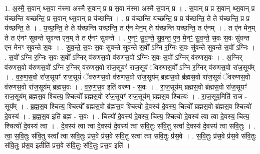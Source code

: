\documentclass[17pt]{extarticle}
\begin{document}
1. अ॒स्मै॒ स॒वान् थ्स॒वा न॑स्मा अस्मै स॒वान् प्र प्र स॒वा न॑स्मा अस्मै स॒वान् प्र । . स॒वान् प्र प्र स॒वान् थ्स॒वान् प्र य॑च्छन्ति यच्छन्ति॒ प्र स॒वान् थ्स॒वान् प्र य॑च्छन्ति । . प्र य॑च्छन्ति यच्छन्ति॒ प्र प्र य॑च्छन्ति॒ ते ते य॑च्छन्ति॒ प्र प्र य॑च्छन्ति॒ ते । . य॒च्छ॒न्ति॒ ते ते य॑च्छन्ति यच्छन्ति॒ त ए॑न मेन॒म् ते य॑च्छन्ति यच्छन्ति॒ त ए॑नम् । . त ए॑न मेन॒म् ते त ए॑नꣳ सुवन्ते सुवन्त एन॒म् ते त ए॑नꣳ सुवन्ते । . ए॒नꣳ॒॒ सु॒व॒न्ते॒ सु॒व॒न्त॒ ए॒न॒ मे॒नꣳ॒॒ सु॒व॒न्ते॒ स॒वः स॒वः सु॑वन्त एन मेनꣳ सुवन्ते स॒वः । . सु॒व॒न्ते॒ स॒वः स॒वः सु॑वन्ते सुवन्ते स॒वो᳚ ऽग्नि र॒ग्निः स॒वः सु॑वन्ते सुवन्ते स॒वो᳚ ऽग्निः । . स॒वो᳚ ऽग्नि र॒ग्निः स॒वः स॒वो᳚ ऽग्निर् व॑रुणस॒वो व॑रुणस॒वो᳚ ऽग्निः स॒वः स॒वो᳚ ऽग्निर् व॑रुणस॒वः । . अ॒ग्निर् व॑रुणस॒वो व॑रुणस॒वो᳚ ऽग्नि र॒ग्निर् व॑रुणस॒वो रा॑ज॒सूयꣳ॑ राज॒सूयं॑ ॅवरुणस॒वो᳚ ऽग्नि र॒ग्निर् व॑रुणस॒वो रा॑ज॒सूय᳚म् । . व॒रु॒ण॒स॒वो रा॑ज॒सूयꣳ॑ राज॒सूयं॑ ॅवरुणस॒वो व॑रुणस॒वो रा॑ज॒सूय॑म् ब्रह्मस॒वो ब्र॑ह्मस॒वो रा॑ज॒सूयं॑ ॅवरुणस॒वो व॑रुणस॒वो रा॑ज॒सूय॑म् ब्रह्मस॒वः । . व॒रु॒ण॒स॒व इति॑ वरुण - स॒वः । . रा॒ज॒सूय॑म् ब्रह्मस॒वो ब्र॑ह्मस॒वो रा॑ज॒सूयꣳ॑ राज॒सूय॑म् ब्रह्मस॒व श्चित्य॒ श्चित्यो᳚ ब्रह्मस॒वो रा॑ज॒सूयꣳ॑ राज॒सूय॑म् ब्रह्मस॒व श्चित्यः॑ । . रा॒ज॒सूय॒मिति॑ राज - सूय᳚म् । . ब्र॒ह्म॒स॒व श्चित्य॒ श्चित्यो᳚ ब्रह्मस॒वो ब्र॑ह्मस॒व श्चित्यो॑ दे॒वस्य॑ दे॒वस्य॒ चित्यो᳚ ब्रह्मस॒वो ब्र॑ह्मस॒व श्चित्यो॑ दे॒वस्य॑ । . ब्र॒ह्म॒स॒व इति॑ ब्रह्म - स॒वः । . चित्यो॑ दे॒वस्य॑ दे॒वस्य॒ चित्य॒ श्चित्यो॑ दे॒वस्य॑ त्वा त्वा दे॒वस्य॒ चित्य॒ श्चित्यो॑ दे॒वस्य॑ त्वा । . दे॒वस्य॑ त्वा त्वा दे॒वस्य॑ दे॒वस्य॑ त्वा सवि॒तुः स॑वि॒तु स्त्वा॑ दे॒वस्य॑ दे॒वस्य॑ त्वा सवि॒तुः । . त्वा॒ स॒वि॒तुः स॑वि॒तु स्त्वा᳚ त्वा सवि॒तुः प्र॑स॒वे प्र॑स॒वे स॑वि॒तु स्त्वा᳚ त्वा सवि॒तुः प्र॑स॒वे । . स॒वि॒तुः प्र॑स॒वे प्र॑स॒वे स॑वि॒तुः स॑वि॒तुः प्र॑स॒व इतीति॑ प्रस॒वे स॑वि॒तुः स॑वि॒तुः प्र॑स॒व इति॑ । \newline
\end{document}
